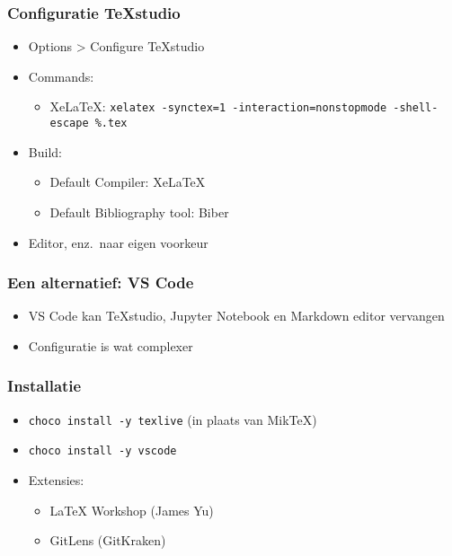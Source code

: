\documentclass[aspectratio=169]{beamer}
\begin{document}
\begin{frame}
  \frametitle{Configuratie TeXstudio}

  \begin{itemize}
    \item Options > Configure TeXstudio
    \item Commands:
          \begin{itemize}
            \item XeLaTeX\@: \texttt{xelatex -synctex=1 -interaction=nonstopmode -shell-escape \%.tex}
          \end{itemize}
    \item Build:
          \begin{itemize}
            \item Default Compiler: XeLaTeX
            \item Default Bibliography tool: Biber
          \end{itemize}
    \item Editor, enz.\ naar eigen voorkeur
  \end{itemize}
\end{frame}

\begin{frame}
  \frametitle{Een alternatief: VS Code}

  \begin{itemize}
    \item VS Code kan {\TeX}studio, Jupyter Notebook en Markdown editor vervangen
    \item Configuratie is wat complexer
  \end{itemize}
\end{frame}

\begin{frame}
  \frametitle{Installatie}

  \begin{itemize}
    \item \texttt{choco install -y texlive}  (in plaats van Mik{\TeX})
    \item \texttt{choco install -y vscode}
    \item Extensies:
          \begin{itemize}
            \item {\LaTeX} Workshop (James Yu)
            \item GitLens (GitKraken)
          \end{itemize}
  \end{itemize}
\end{frame}
\end{document}
